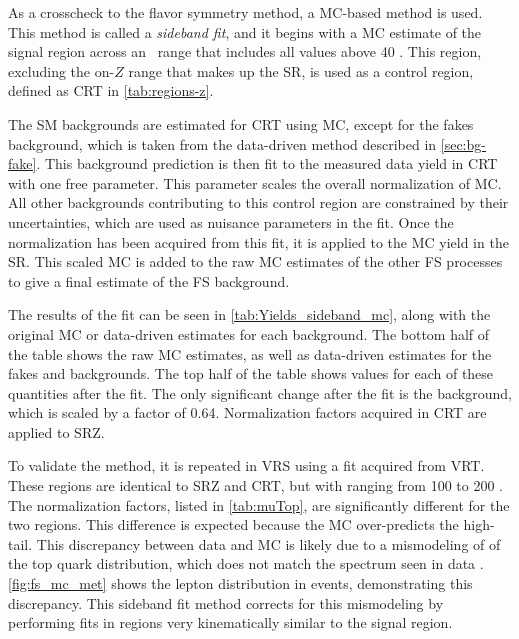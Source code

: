 As a crosscheck to the flavor symmetry method, a \ac{MC}-based method is used. This method is called a \textit{sideband fit}, and it begins with a \ac{MC} estimate of the signal region across an \mll~range that includes all values above 40 \gev. This region, excluding the on-$Z$ range that makes up the \ac{SR}, is used as a control region, defined as CRT in \autoref{tab:regions-z}. 

The \ac{SM} backgrounds are estimated for CRT using \ac{MC}, except for the fakes background, which is taken from the data-driven method described in \autoref{sec:bg-fake}. This background prediction is then fit to the measured data yield in CRT with one free parameter. This parameter scales the overall normalization of \ttbar \ac{MC}. All other backgrounds contributing to this control region are constrained by their uncertainties, which are used as nuisance parameters in the fit. Once the \ttbar normalization has been acquired from this fit, it is applied to the \ttbar \ac{MC} yield in the \ac{SR}. This scaled \ttbar \ac{MC} is added to the raw \ac{MC} estimates of the other \ac{FS} processes to give a final estimate of the \ac{FS} background. 

The results of the fit can be seen in \autoref{tab:Yields_sideband_mc}, along with the original \ac{MC} or data-driven estimates for each background. The bottom half of the table shows the raw \ac{MC} estimates, as well as data-driven estimates for the fakes and \dyjets backgrounds. The top half of the table shows values for each of these quantities after the fit. The only significant change after the fit is the \ttbar background, which is scaled by a factor of 0.64. Normalization factors acquired in CRT are applied to SRZ. 



To validate the method, it is repeated in VRS using a fit acquired from VRT. These regions are identical to SRZ and CRT, but with \met ranging from 100 to 200 \gev. The normalization factors, listed in \autoref{tab:muTop}, are significantly different for the two regions. This difference is expected because the \ttbar \ac{MC} over-predicts the high-\met tail. This discrepancy between data and \ac{MC} is likely due to a mismodeling of of the top quark \pt distribution, which does not match the spectrum seen in data \cite{Aad:2015hna,Khachatryan:2016gxp}. \autoref{fig:fs_mc_met} shows the lepton \pt distribution in \ttbar events, demonstrating this discrepancy. This sideband fit method corrects for this mismodeling by performing fits in regions very kinematically similar to the signal region. 

